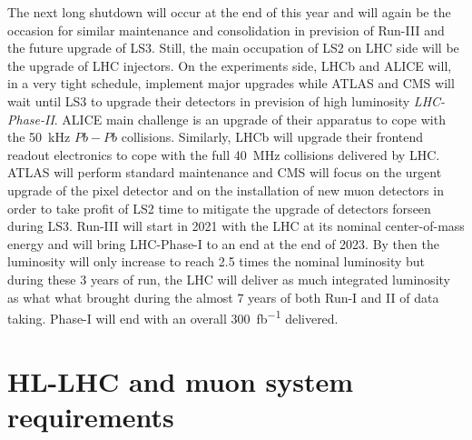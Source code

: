 	The next long shutdown will occur at the end of this year and will again be the occasion for similar maintenance and consolidation in prevision of Run-III and the future upgrade of LS3. Still, the main occupation of LS2 on LHC side will be the upgrade of LHC injectors. On the experiments side, LHCb and ALICE will, in a very tight schedule, implement major upgrades while ATLAS and CMS will wait until LS3 to upgrade their detectors in prevision of high luminosity \textit{LHC-Phase-II}. ALICE main challenge is an upgrade of their apparatus to cope with the \SI{50}{kHz} $Pb-Pb$ collisions. Similarly, LHCb will upgrade their frontend readout electronics to cope with the full \SI{40}{MHz} collisions delivered by LHC. ATLAS will perform standard maintenance and CMS will focus on the urgent upgrade of the pixel detector and on the installation of new muon detectors in order to take profit of LS2 time to mitigate the upgrade of detectors forseen during LS3. Run-III will start in 2021 with the LHC at its nominal center-of-mass energy and will bring LHC-Phase-I to an end at the end of 2023. By then the luminosity will only increase to reach 2.5 times the nominal luminosity but during these 3 years of run, the LHC will deliver as much integrated luminosity as what what brought during the almost 7 years of both Run-I and II of data taking. Phase-I will end with an overall \SI{300}{fb^{-1}} delivered.\\
	
\section{\acl{HL-LHC} and muon system requirements}
\label{chapt3:sec:requirements}
	
